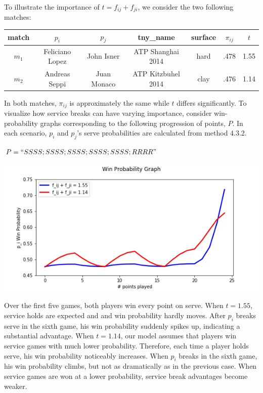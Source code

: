 \documentclass[chapterprefix=false]{report}
\begin{document}
To illustrate the importance of $t=f_{ij}+f_{ji}$, we consider the two following matches:

\begin{center}
\begin{tabular}{ |c|c|c|c|c|c|c| } 
 \hline
 match & $p_i$ & $p_j$ & tny\_name & surface
 & $\pi_{ij}$ & $t$ \\ 
 \hline
 $m_1$ & Feliciano Lopez & John Isner & ATP Shanghai 2014 & hard & .478 & 1.55 \\
 \hline
  $m_2$ & Andreas Seppi & Juan Monaco & ATP Kitzb$\ddot{\text{u}}$hel 2014 & clay & .476 & 1.14
 \\
 \hline

\end{tabular}
\end{center}

In both matches, $\pi_{ij}$ is approximately the same while $t$ differs significantly. To visualize how service breaks can have varying importance, consider win-probability graphs corresponding to the following progression of points, $P$. In each scenario, $p_i$ and $p_j$'s serve probabilities are calculated from method 4.3.2.

$P=``SSSS;SSSS;SSSS;SSSS;SSSS;RRRR"$

\includegraphics[scale=.7]{m12_wp}

Over the first five games, both players win every point on serve. When $t=1.55$, service holds are expected and and win probability hardly moves. After $p_i$ breaks serve in the sixth game, his win probability suddenly spikes up, indicating a substantial advantage. When $t=1.14$, our model assumes that players win service games with much lower probability. Therefore, each time a player holds serve, his win probability noticeably increases. When $p_i$ breaks in the sixth game, his win probability climbs, but not as dramatically as in the previous case. When service games are won at a lower probability, service break advantages become weaker.
\end{document}
